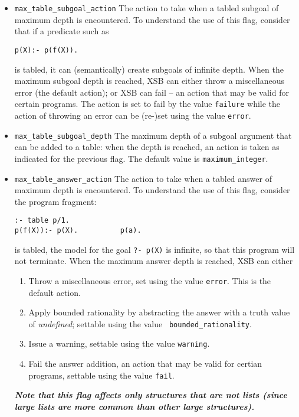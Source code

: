 \begin{description}
\begin{itemize}
%
\item {\tt max\_table\_subgoal\_action} The action to take when a tabled
  subgoal of maximum depth is encountered.  To understand the use of
  this flag, consider that if a predicate such as
\begin{verbatim}
p(X):- p(f(X)).
\end{verbatim}
  is tabled, it can (semantically) create subgoals of infinite depth.
  When the maximum subgoal depth is reached, XSB can either throw a
  miscellaneous error (the default action); or XSB can fail -- an
  action that may be valid for certain programs.  The action is set to
  fail by the value {\tt failure} while the action of throwing an
  error can be (re-)set using the value {\tt error}.

\item {\tt max\_table\_subgoal\_depth} The maximum depth of a subgoal
  argument that can be added to a table: when the depth is reached, an
  action is taken as indicated for the previous flag.  The default
  value is {\tt maximum\_integer}.

\item {\tt max\_table\_answer\_action} The action to take when a tabled
  answer of maximum depth is encountered.  To understand the use of
  this flag, consider the program fragment:
\begin{verbatim}
:- table p/1.
p(f(X)):- p(X).          p(a).
\end{verbatim}
  is tabled, the model for the goal {\tt ?- p(X)} is infinite, so that
  this program will not terminate.  When the maximum answer depth is
  reached, XSB can either 
\begin{enumerate}
\item Throw a miscellaneous error, set using the value {\tt error}.
  This is the default action.
%
\item Apply bounded rationality by abstracting the answer with a truth
  value of {\em undefined}; settable using the value {\tt
    bounded\_rationality}.
%
\item Issue a warning, settable using the value {\tt warning}.
%
\item Fail the answer addition, an action that may be valid for
  certian programs, settable using the value {\tt fail}.
%
\end{enumerate}
%
{\bf {\em Note that this flag affects only structures that are not lists (since
large lists are more common than other large structures).}}


\end{itemize}
\end{description}
